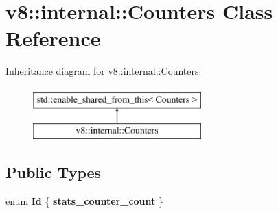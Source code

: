 \hypertarget{classv8_1_1internal_1_1Counters}{}\section{v8\+:\+:internal\+:\+:Counters Class Reference}
\label{classv8_1_1internal_1_1Counters}
Inheritance diagram for v8\+:\+:internal\+:\+:Counters\+:\begin{figure}[H]
\begin{center}
\leavevmode
\includegraphics[height=2.000000cm]{classv8_1_1internal_1_1Counters}
\end{center}
\end{figure}
\subsection*{Public Types}
\begin{DoxyCompactItemize}
\item 
\mbox{\label{classv8_1_1internal_1_1Counters_a77f5e90ac882f961ab168d691da5057c}} 
enum {\bfseries Id} \{ {\bfseries stats\+\_\+counter\+\_\+count}
 \}
\end{DoxyCompactItemize}
